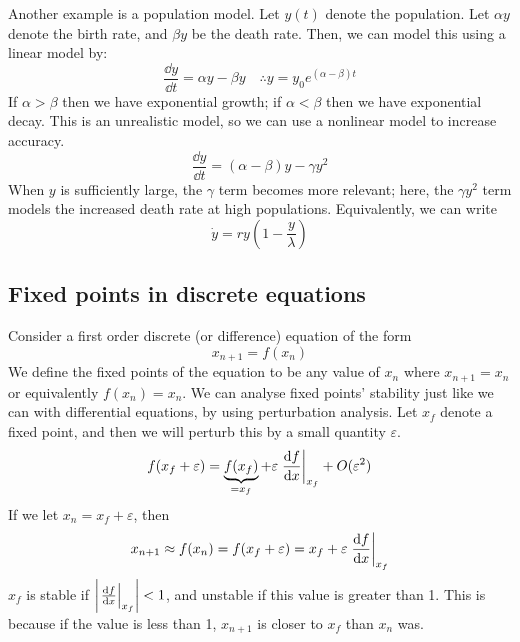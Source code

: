 Another example is a population model.
Let \(y(t)\) denote the population.
Let \(\alpha y\) denote the birth rate, and \(\beta y\) be the death rate.
Then, we can model this using a linear model by:
\[
	\frac{\dd{y}}{\dd{t}} = \alpha y - \beta y \quad \therefore y = y_0 e^{(\alpha - \beta) t}
\]
If \(\alpha > \beta\) then we have exponential growth; if \(\alpha < \beta\) then we have exponential decay.
This is an unrealistic model, so we can use a nonlinear model to increase accuracy.
\[
	\frac{\dd{y}}{\dd{t}} = (\alpha - \beta)y - \gamma y^2
\]
When \(y\) is sufficiently large, the \(\gamma\) term becomes more relevant; here, the \(\gamma y^2\) term models the increased death rate at high populations.
Equivalently, we can write
\[
	\dot y = ry\left(1 - \frac{y}{\lambda}\right)
\]

\subsection{Fixed points in discrete equations}
Consider a first order discrete (or difference) equation of the form
\[
	x_{n+1} = f(x_n)
\]
We define the fixed points of the equation to be any value of \(x_n\) where \(x_{n+1} = x_n\) or equivalently \(f(x_n) = x_n\).
We can analyse fixed points' stability just like we can with differential equations, by using perturbation analysis.
Let \(x_f\) denote a fixed point, and then we will perturb this by a small quantity \(\varepsilon\).
\[
	f(x_f + \varepsilon) = \underbrace{f(x_f)}_{\mathclap{=x_f}} + \varepsilon \eval{\frac{\dd{f}}{\dd{x}}}_{x_f} + O(\varepsilon^2)
\]
If we let \(x_n = x_f + \varepsilon\), then
\[
	x_{n+1} \approx f(x_n) = f(x_f + \varepsilon) = x_f + \varepsilon \eval{\frac{\dd{f}}{\dd{x}}}_{x_f}
\]
\(x_f\) is stable if \(\abs{\eval{\frac{\dd{f}}{\dd{x}}}_{x_f}} < 1\), and unstable if this value is greater than 1.
This is because if the value is less than 1, \(x_{n+1}\) is closer to \(x_f\) than \(x_n\) was.

